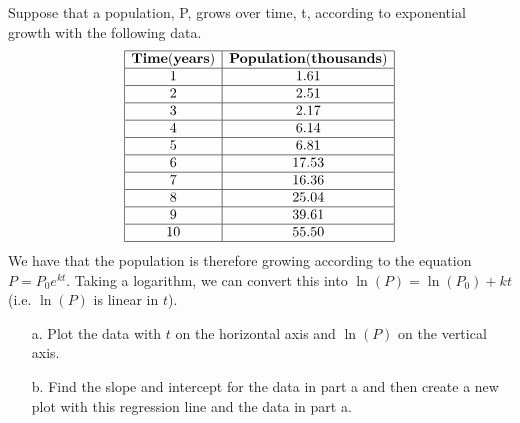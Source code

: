 {Suppose that a population, P, grows over time, t, according to exponential growth with the following data.
\[
\begin{array}{|c|c|}
\hline
{\bf Time (years) } & {\bf Population (thousands)} \\ \hline
1&	1.61\\ \hline
2&	2.51\\ \hline
3&	2.17\\ \hline
4&	6.14\\ \hline
5&	6.81\\ \hline
6&	17.53\\ \hline
7&  16.36\\ \hline
8&  25.04\\ \hline
9&  39.61\\ \hline
10 &  55.50\\ 
\hline
\end{array}
\]
We have that the population is therefore growing according to the equation $P = P_0 e^{kt}$.  Taking a logarithm, we can convert this into $\ln(P) = \ln(P_0) + kt$ (i.e. $\ln(P)$ is linear in $t$).
\begin{enumerate}
\item[a.] Plot the data with $t$ on the horizontal axis and $\ln(P)$ on the vertical axis.
\item[b.] Find the slope and intercept for the data in part a and then create a new plot with this regression line and the data in part a.
\end{enumerate}}
{}